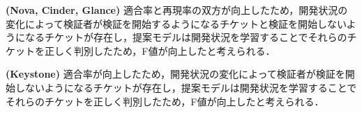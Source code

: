 \documentclass[11pt]{jreport}
\begin{document}
\textbf{ (Nova, Cinder, Glance) }適合率と再現率の双方が向上したため，開発状況の変化によって検証者が検証を開始するようになるチケットと検証を開始しないようになるチケットが存在し，提案モデルは開発状況を学習することでそれらのチケットを正しく判別したため，F値が向上したと考えられる．

\textbf{ (Keystone) }適合率が向上したため，開発状況の変化によって検証者が検証を開始しないようになるチケットが存在し，提案モデルは開発状況を学習することでそれらのチケットを正しく判別したため，F値が向上したと考えられる．

\end{document}
